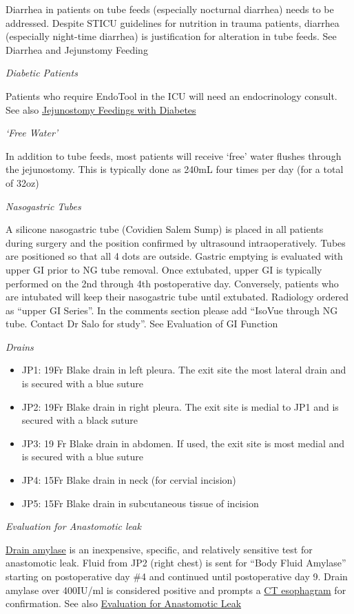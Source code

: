 \documentclass[
]{book}
\providecommand{\tightlist}{%
  \setlength{\itemsep}{0pt}\setlength{\parskip}{0pt}}
\begin{document}
Diarrhea in patients on tube feeds (especially nocturnal diarrhea) needs to be addressed. Despite STICU guidelines for nutrition in trauma patients, diarrhea (especially night-time diarrhea) is justification for alteration in tube feeds. See Diarrhea and Jejunstomy Feeding

\emph{Diabetic Patients}

Patients who require EndoTool in the ICU will need an endocrinology consult. See also \protect\hyperlink{jejunostomy_diabetes}{Jejunostomy Feedings with Diabetes}

\emph{`Free Water'}

In addition to tube feeds, most patients will receive `free' water flushes through the jejunostomy. This is typically done as 240mL four times per day (for a total of 32oz)

\emph{Nasogastric Tubes}

A silicone nasogastric tube (Covidien Salem Sump) is placed in all patients during surgery and the position confirmed by ultrasound intraoperatively. Tubes are positioned so that all 4 dots are outside. Gastric emptying is evaluated with upper GI prior to NG tube removal. Once extubated, upper GI is typically performed on the 2nd through 4th postoperative day. Conversely, patients who are intubated will keep their nasogastric tube until extubated. Radiology ordered as ``upper GI Series''. In the comments section please add ``IsoVue through NG tube. Contact Dr Salo for study''. See Evaluation of GI Function

\emph{Drains}

\begin{itemize}
\tightlist
\item
  JP1: 19Fr Blake drain in left pleura. The exit site the most lateral drain and is secured with a blue suture
\item
  JP2: 19Fr Blake drain in right pleura. The exit site is medial to JP1 and is secured with a black suture
\item
  JP3: 19 Fr Blake drain in abdomen. If used, the exit site is most medial and is secured with a blue suture
\item
  JP4: 15Fr Blake drain in neck (for cervial incision)
\item
  JP5: 15Fr Blake drain in subcutaneous tissue of incision
\end{itemize}

\emph{Evaluation for Anastomotic leak}

\protect\hyperlink{drain_amylase}{Drain amylase} is an inexpensive, specific, and relatively sensitive test for anastomotic leak. Fluid from JP2 (right chest) is sent for ``Body Fluid Amylase'' starting on postoperative day \#4 and continued until postoperative day 9. Drain amylase over 400IU/ml is considered positive and prompts a \protect\hyperlink{ct_esophagram}{CT esophagram} for confirmation. See also \protect\hyperlink{leak_evaluation}{Evaluation for Anastomotic Leak}
\end{document}
